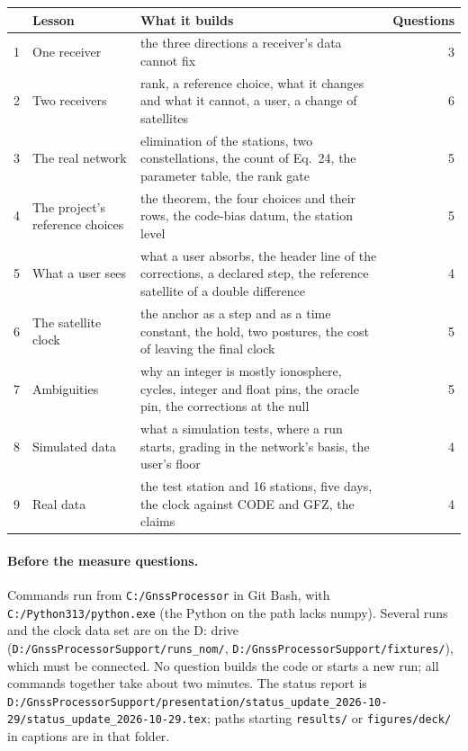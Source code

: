 \documentclass[11pt,letterpaper]{article}
\newcounter{question}[section]
\begin{document}
\begin{center}\footnotesize
\begin{tabular}{@{}p{0.4cm}>{\raggedright\arraybackslash}p{4.0cm}>{\raggedright\arraybackslash}p{8.6cm}r@{}}
\toprule
& Lesson & What it builds & Questions \\
\midrule
1 & One receiver & the three directions a receiver's data cannot fix & 3 \\
2 & Two receivers & rank, a reference choice, what it changes and what it cannot, a user, a change of satellites & 6 \\
3 & The real network & elimination of the stations, two constellations, the count of Eq.~24, the parameter table, the rank gate & 5 \\
4 & The project's reference choices & the theorem, the four choices and their rows, the code-bias datum, the station level & 5 \\
5 & What a user sees & what a user absorbs, the header line of the corrections, a declared step, the reference satellite of a double difference & 4 \\
6 & The satellite clock & the anchor as a step and as a time constant, the hold, two postures, the cost of leaving the final clock & 5 \\
7 & Ambiguities & why an integer is mostly ionosphere, cycles, integer and float pins, the oracle pin, the corrections at the null & 5 \\
8 & Simulated data & what a simulation tests, where a run starts, grading in the network's basis, the user's floor & 4 \\
9 & Real data & the test station and 16 stations, five days, the clock against CODE and GFZ, the claims & 4 \\
\bottomrule
\end{tabular}
\end{center}

\paragraph{Before the measure questions.} Commands run from
\texttt{C:/GnssProcessor} in Git Bash, with
\texttt{C:/Python313/python.exe} (the Python on the path lacks numpy). Several
runs and the clock data set are on the D: drive
(\texttt{D:/GnssProcessorSupport/runs\_nom/}, \texttt{D:/GnssProcessorSupport/fixtures/}),
which must be connected. No question builds the code or starts a new run; all
commands together take about two minutes. The status report is
\texttt{D:/GnssProcessorSupport/presentation/status\_update\_2026-10-29/status\_update\_2026-10-29.tex};
paths starting \texttt{results/} or \texttt{figures/deck/} in captions are in that
folder.
\end{document}
